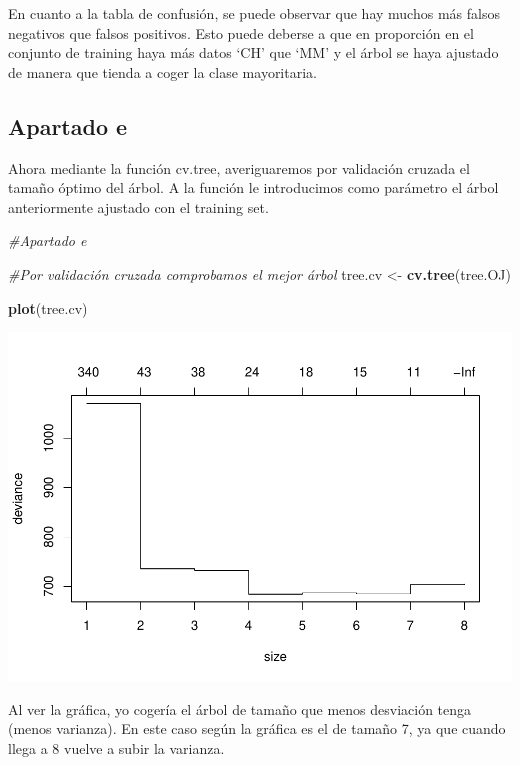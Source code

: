 \documentclass[]{article}
\newenvironment{Shaded}{\begin{snugshade}}{\end{snugshade}}
\newcommand{\KeywordTok}[1]{\textcolor[rgb]{0.13,0.29,0.53}{\textbf{{#1}}}}
\newcommand{\StringTok}[1]{\textcolor[rgb]{0.31,0.60,0.02}{{#1}}}
\newcommand{\CommentTok}[1]{\textcolor[rgb]{0.56,0.35,0.01}{\textit{{#1}}}}
\newcommand{\NormalTok}[1]{{#1}}
\begin{document}
En cuanto a la tabla de confusión, se puede observar que hay muchos más
falsos negativos que falsos positivos. Esto puede deberse a que en
proporción en el conjunto de training haya más datos `CH' que `MM' y el
árbol se haya ajustado de manera que tienda a coger la clase
mayoritaria.

\subsection{Apartado e}\label{apartado-e}

Ahora mediante la función cv.tree, averiguaremos por validación cruzada
el tamaño óptimo del árbol. A la función le introducimos como parámetro
el árbol anteriormente ajustado con el training set.

\begin{Shaded}
\begin{Highlighting}[]
\CommentTok{#Apartado e}

\CommentTok{#Por validación cruzada comprobamos el mejor árbol}
\NormalTok{tree.cv <-}\StringTok{ }\KeywordTok{cv.tree}\NormalTok{(tree.OJ)}

\KeywordTok{plot}\NormalTok{(tree.cv)}
\end{Highlighting}
\end{Shaded}

\includegraphics{TrabajoPracticas3_files/figure-latex/unnamed-chunk-72-1.pdf}

Al ver la gráfica, yo cogería el árbol de tamaño que menos desviación
tenga (menos varianza). En este caso según la gráfica es el de tamaño 7,
ya que cuando llega a 8 vuelve a subir la varianza.
\end{document}
